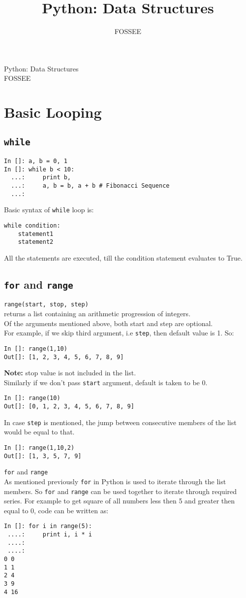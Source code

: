 \documentclass[12pt]{article}
\title{Python: Data Structures}
\author{FOSSEE}
\newcommand{\typ}[1]{\lstinline{#1}}
\begin{document}
\date{}
\vspace{-1in}
\begin{center}
\LARGE{Python: Data Structures}\\
\large{FOSSEE}
\end{center}
\section{Basic Looping}
\subsection{\typ{while}}
  \begin{lstlisting}
In []: a, b = 0, 1
In []: while b < 10:  
  ...:     print b,
  ...:     a, b = b, a + b # Fibonacci Sequence
  ...:
\end{lstlisting}
Basic syntax of \typ{while} loop is:
\begin{lstlisting}
while condition:
    statement1
    statement2
\end{lstlisting}
All the statements are executed, till the condition statement evaluates to True.
\subsection{\typ{for} and \typ{range}}
\typ{range(start, stop, step)}\\
returns a list containing an arithmetic progression of integers.\\
Of the arguments mentioned above, both start and step are optional.\\
For example, if we skip third argument, i.e \typ{step}, then default value is 1. So:
\begin{lstlisting}
In []: range(1,10)
Out[]: [1, 2, 3, 4, 5, 6, 7, 8, 9]
\end{lstlisting}
\textbf{Note:} stop value is not included in the list.\\
Similarly if we don't pass \typ{start} argument, default is taken to be 0.
\begin{lstlisting}
In []: range(10)
Out[]: [0, 1, 2, 3, 4, 5, 6, 7, 8, 9]
\end{lstlisting}
In case \typ{step} is mentioned, the jump between consecutive members of the list would be equal to that.
\begin{lstlisting}
In []: range(1,10,2)
Out[]: [1, 3, 5, 7, 9]
\end{lstlisting}
\typ{for} and \typ{range}\\
As mentioned previously \typ{for} in Python is used to iterate through the list members. So \typ{for} and \typ{range} can be used together to iterate through required series. For example to get square of all numbers less then 5 and greater then equal to 0, code can be written as:
\begin{lstlisting}
In []: for i in range(5):
 ....:     print i, i * i
 ....:
 ....:
0 0
1 1
2 4
3 9
4 16
\end{lstlisting}
\end{document}
